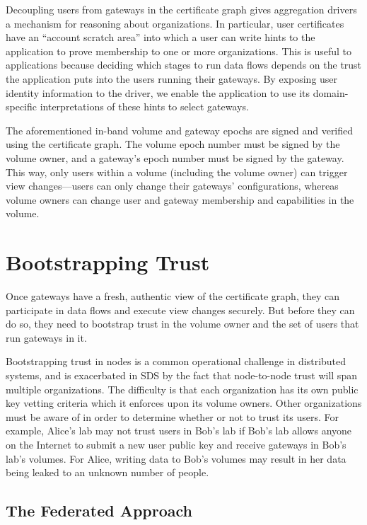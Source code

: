 Decoupling users from gateways in the certificate graph gives aggregation
drivers a mechanism for reasoning about organizations.  In particular, user
certificates have an ``account scratch area'' into which a user can write hints to the
application to prove membership to one or more organizations.  This is useful
to applications because deciding which
stages to run data flows depends on the trust the application
puts into the users running their gateways.  By exposing user identity
information to the driver, we enable the application to use its domain-specific
interpretations of these hints to select gateways.

The aforementioned in-band volume and gateway epochs are signed and
verified using the certificate graph.  The volume epoch number must be signed by
the volume owner, and a gateway's epoch number must be signed by the gateway.
This way, only users within a volume (including the volume owner) can trigger
view changes---users can only change their gateways' configurations, whereas volume
owners can change user and gateway membership and capabilities in the volume.

\section{Bootstrapping Trust}
\label{sec:bootstrapping-trust}

Once gateways have a fresh, authentic view of the certificate graph, they can
participate in data flows and execute view changes securely.  But before they
can do so, they need to bootstrap trust in the volume owner and the set of users
that run gateways in it.

Bootstrapping trust in nodes is a common operational challenge in
distributed systems, and is exacerbated in SDS by the fact that node-to-node
trust will span multiple organizations.
The difficulty is that each organization has its own public
key vetting criteria which it enforces upon its volume owners.
Other organizations must be aware of in order to determine
whether or not to trust its users.  For example, Alice's lab may
not trust users in Bob's lab if Bob's lab allows anyone on the Internet
to submit a new user public key and receive gateways in Bob's
lab's volumes.  For Alice, writing data to Bob's volumes may result in her data
being leaked to an unknown number of people.

\subsection{The Federated Approach}

